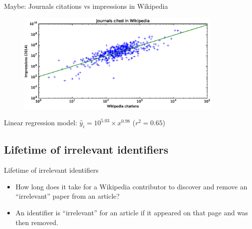 \documentclass{beamer}
\begin{document}
\begin{frame}{Maybe: Journals citations vs impressions in Wikipedia}
    \begin{figure}
    \centering
    \includegraphics[width=0.9\textwidth]{assets/journals_appearances_impressions_loglog_slides}
    \end{figure}
    \centering
    Linear regression model: $\hat{y}_i = 10^{5.03} \times x^{0.98}$ ($r^2=0.65$)
\end{frame}

\subsection{Lifetime of irrelevant identifiers}
\begin{frame}{Lifetime of irrelevant identifiers}
    \begin{itemize}
        \item How long does it take for a Wikipedia contributor to discover and remove an ``irrelevant'' paper from an article?
        \item An identifier is ``irrelevant'' for an article if it appeared on that page and was then removed.
    \end{itemize}
\end{frame}
\end{document}
